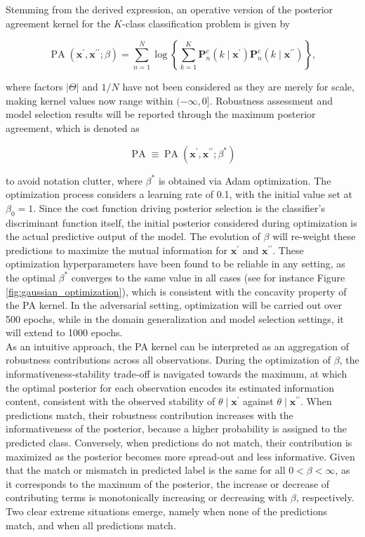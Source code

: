 Stemming from the derived expression, an operative version of the 
posterior agreement kernel for the $K$-class classification problem is given by

$$
\operatorname{PA}\left(\bm{x}^{\prime}, \bm{x}^{\prime \prime} ; \beta\right)=\sum_{n=1}^N \log \left\{ \sum_{k=1}^K \mathbf{P}_n^c\left(k \mid \bm{x}^{\prime}\right) \mathbf{P}_n^c\left(k \mid \bm{x}^{\prime \prime}\right)\right\},
$$

where factors $|\Theta|$ and $1/N$ have not been considered as they are merely for 
scale, making kernel values now range within $(-\infty, 0]$. Robustness assessment and 
model selection results will be reported through the maximum 
posterior agreement, which is denoted as

$$
\operatorname{PA} \equiv \operatorname{PA}\left(\bm{x}^{\prime}, \bm{x}^{\prime \prime}; \beta^{*}\right)
$$

to avoid notation clutter, where $\beta^{*}$ is obtained via Adam optimization. 
The optimization process considers a  learning rate of 0.1, with the initial value set at $\beta_0 = 1$. Since the cost function 
driving posterior selection is the classifier's discriminant function itself, 
the initial posterior considered during optimization is the actual predictive output of the 
model. The evolution of $\beta$ will re-weight these predictions to maximize the mutual information
for $\bm{x}^{\prime}$ and $\bm{x}^{\prime \prime}$. 
These optimization hyperparameters have been found to be reliable in any setting, as the optimal
$\beta^*$ converges to the same value in all cases (see for instance Figure \ref{fig:gaussian_optimization}), 
which is consistent with the concavity property of the PA kernel. In the adversarial 
setting, optimization will be carried out over 500 epochs, while in the domain generalization 
and model selection settings, it will extend to 1000 epochs. \\

As an intuitive approach, the PA kernel can be interpreted as an aggregation of robustness contributions 
across all observations. During the optimization of $\beta$, the informativeness-stability trade-off is navigated 
towards the maximum, at which the optimal posterior for each observation encodes its estimated information content,
consistent with the observed stability of $\theta \mid \bm{x}^{\prime}$ against $\theta \mid \bm{x}^{\prime\prime}$. 
When predictions match, their robustness contribution increases with the 
informativeness of the posterior, because a higher probability is assigned to the predicted
class. Conversely, when predictions do not match, their contribution is maximized as the posterior becomes 
more spread-out and less informative. Given that the match or mismatch in predicted label is the same for 
all $0 < \beta < \infty$, as it corresponds to the maximum of the
posterior, the increase or decrease of contributing terms is monotonically increasing or decreasing with $\beta$, 
respectively. Two clear extreme situations emerge, namely when none of the predictions match, and 
when all predictions match.

